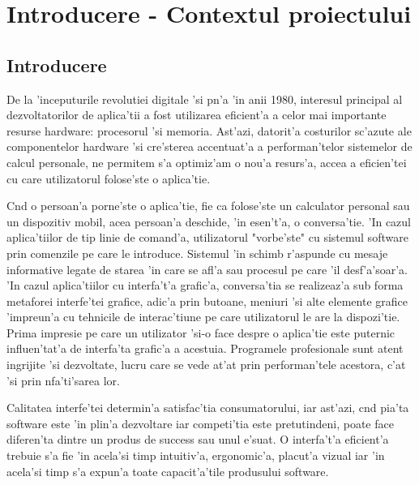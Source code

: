 \chapter{Introducere - Contextul proiectului}
\pagestyle{headings}

\section{Introducere}

De la 'inceputurile revolutiei digitale 'si p{\ia}n'a 'in anii 1980, interesul principal al dezvoltatorilor de aplica'tii a fost utilizarea eficient'a a celor mai importante resurse hardware: procesorul 'si memoria. Ast'azi, datorit'a costurilor sc'azute ale componentelor hardware 'si cre'sterea accentuat'a a performan'telor sistemelor de calcul personale, ne permitem s'a optimiz'am o nou'a resurs'a, accea a eficien'tei cu care utilizatorul folose'ste o aplica'tie.

\medskip

C{\ia}nd o persoan'a porne'ste o aplica'tie, fie ca folose'ste un calculator personal sau un dispozitiv mobil, acea persoan'a deschide, 'in esen't'a, o conversa'tie. 'In cazul aplica'tiilor de tip linie de comand'a, utilizatorul "vorbe'ste" cu sistemul software prin comenzile pe care le introduce. Sistemul 'in schimb r'aspunde cu mesaje informative legate de starea 'in care se afl'a sau procesul pe care 'il desf'a'soar'a. 'In cazul aplica'tiilor cu interfa't'a grafic'a, conversa'tia se realizeaz'a sub forma metaforei interfe'tei grafice, adic'a prin butoane, meniuri 'si alte elemente grafice 'impreun'a cu tehnicile de interac'tiune pe care utilizatorul le are la dispozi'tie. Prima impresie pe care un utilizator 'si-o face despre o aplica'tie este puternic influen'tat'a de interfa'ta grafic'a a acestuia. Programele profesionale sunt atent ingrijite 'si dezvoltate, lucru care se vede at'at prin performan'tele acestora, c'at 'si prin {\ia}nfa'ti'sarea lor.

\medskip

Calitatea interfe'tei determin'a satisfac'tia consumatorului, iar ast'azi, c{\ia}nd pia'ta software este 'in plin'a dezvoltare iar competi'tia este pretutindeni, poate face diferen'ta dintre un produs de success sau unul e'suat. O interfa't'a eficient'a trebuie s'a fie 'in acela'si timp intuitiv'a, ergonomic'a, placut'a vizual iar 'in acela'si timp s'a expun'a toate capacit'a'tile produsului software.

\medskip

